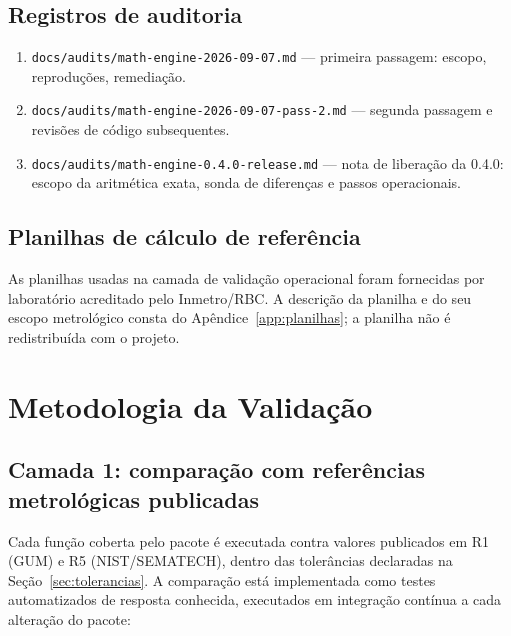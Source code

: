 \documentclass[11pt,a4paper]{article}
\newcommand{\docVersion}{0.4.0}
\begin{document}
\subsection{Registros de auditoria}

\begin{enumerate}[label=A\arabic*., leftmargin=2.6em]
  \item \texttt{docs/audits/math-engine-2026-09-07.md} --- primeira passagem: escopo, reproduções, remediação.
  \item \texttt{docs/audits/math-engine-2026-09-07-pass-2.md} --- segunda passagem e revisões de código subsequentes.
  \item \texttt{docs/audits/math-engine-0.4.0-release.md} --- nota de liberação da \docVersion{}: escopo da aritmética exata, sonda de diferenças e passos operacionais.
\end{enumerate}

\subsection{Planilhas de cálculo de referência}

As planilhas usadas na camada de validação operacional foram fornecidas por laboratório acreditado pelo Inmetro/RBC. A descrição da planilha e do seu escopo metrológico consta do Apêndice~\ref{app:planilhas}; a planilha não é redistribuída com o projeto.

\section{Metodologia da Validação}
\label{sec:metodologia}

\subsection{Camada 1: comparação com referências metrológicas publicadas}

Cada função coberta pelo pacote é executada contra valores publicados em R1 (GUM) e R5 (NIST/SEMATECH), dentro das tolerâncias declaradas na Seção~\ref{sec:tolerancias}. A comparação está implementada como testes automatizados de resposta conhecida, executados em integração contínua a cada alteração do pacote:
\end{document}
